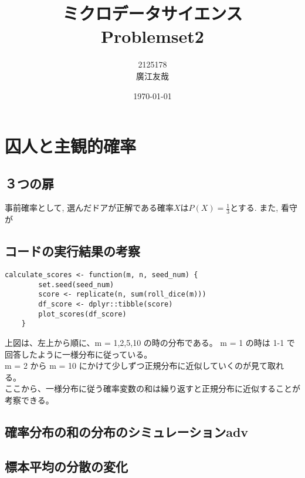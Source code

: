 \documentclass{article}
\begin{document}
\title{ミクロデータサイエンス\\Problemset2}
\author{2125178\\廣江友哉}
\date{\today}
\maketitle


\section{囚人と主観的確率}

\subsection{３つの扉}

事前確率として, 選んだドアが正解である確率$X$は$P(X) = \frac{1}{3}$とする. また, 看守が

\subsection{コードの実行結果の考察}

\begin{lstlisting}[]
	calculate_scores <- function(m, n, seed_num) {
		set.seed(seed_num)
		score <- replicate(n, sum(roll_dice(m)))
		df_score <- dplyr::tibble(score)
		plot_scores(df_score)
	}

\end{lstlisting}


上図は、左上から順に、m = 1,2,5,10 の時の分布である。 
m = 1 の時は 1-1 で回答したように一様分布に従っている。\\
m = 2 から m = 10 にかけて少しずつ正規分布に近似していくのが見て取れる。\\
ここから、一様分布に従う確率変数の和は繰り返すと正規分布に近似することが考察できる。

\subsection{確率分布の和の分布のシミュレーションadv}

\subsection{標本平均の分散の変化}
\end{document}
